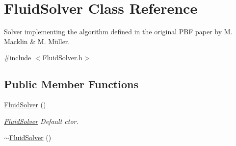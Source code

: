 \hypertarget{classFluidSolver}{}\section{Fluid\+Solver Class Reference}
\label{classFluidSolver}


Solver implementing the algorithm defined in the original P\+BF paper by M. Macklin \& M. Müller.  




{\ttfamily \#include $<$Fluid\+Solver.\+h$>$}

\subsection*{Public Member Functions}
\begin{DoxyCompactItemize}
\item 
\hyperlink{classFluidSolver_acd96a4e00ce999f976eaeb5050d1e50d}{Fluid\+Solver} ()\hypertarget{classFluidSolver_acd96a4e00ce999f976eaeb5050d1e50d}{}\label{classFluidSolver_acd96a4e00ce999f976eaeb5050d1e50d}

\begin{DoxyCompactList}\small\item\em \hyperlink{classFluidSolver}{Fluid\+Solver} Default ctor. \end{DoxyCompactList}\item 
\hyperlink{classFluidSolver_a3f967133e2320b383457cfef08211071}{$\sim$\+Fluid\+Solver} ()\hypertarget{classFluidSolver_a3f967133e2320b383457cfef08211071}{}\label{classFluidSolver_a3f967133e2320b383457cfef08211071}


\end{DoxyCompactItemize}
